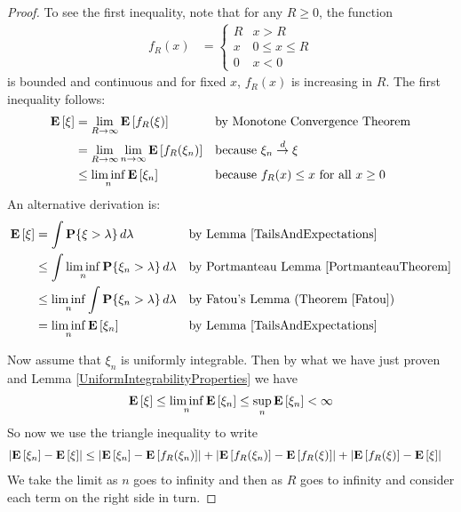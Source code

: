 \begin{proof}
To see the first inequality, note that for any $R \geq 0$, the function
\begin{align*}
f_R(x) &= \begin{cases}
R & \text{$x > R$} \\
x & \text{$0 \leq x \leq R$} \\
0 & \text{$x < 0$}
\end{cases}
\end{align*}
 is bounded and continuous and for fixed $x$, $f_R(x)$ is increasing
 in $R$.  The first inequality follows:
\begin{align*}
\textbf{E}\left[\xi\right] &= \lim_{R \to \infty} \textbf{E}\left[f_R(\xi)\right] & &
\text{by Monotone Convergence Theorem} \\
&= \lim_{R \to \infty} \lim_{n \to \infty} \textbf{E}\left[f_R(\xi_n)\right]
& & \text{because $\xi_n \overset{d}\to \xi$}\\
&\leq \liminf_n \textbf{E}\left[\xi_n\right] & & \text{because $f_R(x) \leq x$
  for all $x \geq 0$}\\
\end{align*}
An alternative derivation is:
\begin{align*}
\textbf{E}\left[\xi\right] &= \int \textbf{P}\{\xi > \lambda\} \, d \lambda & &
\text{by Lemma \ref{TailsAndExpectations}}\\
&\leq \int \liminf_n \textbf{P}\{\xi_n > \lambda\} \, d\lambda & &
\text{by Portmanteau Lemma \ref{PortmanteauTheorem}} \\
&\leq \liminf_n \int \textbf{P}\{\xi_n > \lambda\} \, d\lambda & &
\text{by Fatou's Lemma (Theorem \ref{Fatou})} \\
&= \liminf_n \textbf{E}\left[\xi_n\right] & & \text{by Lemma \ref{TailsAndExpectations}}
\end{align*}

Now assume that $\xi_n$ is uniformly integrable.  Then by what we have
just proven and Lemma \ref{UniformIntegrabilityProperties} we have
\begin{align*}
\textbf{E}\left[\xi\right] \leq \liminf_n \textbf{E}\left[\xi_n\right]  \leq \sup_n
\textbf{E}\left[\xi_n\right] < \infty
\end{align*}
So now we use the triangle inequality to write
\begin{align*}
\left \vert \textbf{E}\left[\xi_n\right] - \textbf{E}\left[\xi\right] \right \vert &\leq
\left \vert \textbf{E}\left[\xi_n\right] - \textbf{E}\left[f_R(\xi_n)\right] \right \vert +
\left \vert \textbf{E}\left[f_R(\xi_n)\right] - \textbf{E}\left[f_R(\xi)\right] \right \vert + \left \vert \textbf{E}\left[f_R(\xi)\right] - \textbf{E}\left[\xi\right] \right \vert
\end{align*}
We take the limit as $n$ goes to infinity and then as $R$ goes to
infinity and consider each term on the right side in turn.


\end{proof}
